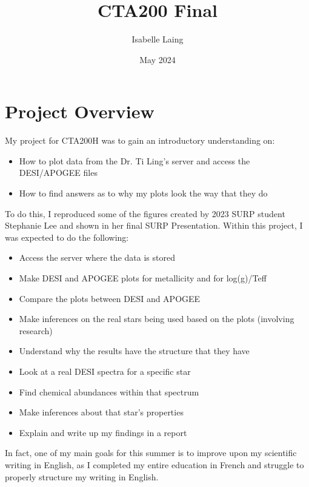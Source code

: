 \documentclass{article}
\title{CTA200 Final}
\author{Isabelle Laing}
\date{May 2024}
\begin{document}
\maketitle

\section*{Project Overview}
My project for CTA200H was to gain an introductory understanding on:
\begin{itemize}
    \item How to plot data from the Dr. Ti Ling’s server and access the DESI/APOGEE files
    \item How to find answers as to why my plots look the way that they do
\end{itemize}

To do this, I reproduced some of the figures created by 2023 SURP student Stephanie Lee and shown in her final SURP Presentation. Within this project, I was expected to do the following:
\begin{itemize}
    \item Access the server where the data is stored
    \item Make DESI and APOGEE plots for metallicity and for log(g)/Teff
    \item Compare the plots between DESI and APOGEE
    \item Make inferences on the real stars being used based on the plots (involving research)
    \item Understand why the results have the structure that they have
    \item Look at a real DESI spectra for a specific star
    \item Find chemical abundances within that spectrum
    \item Make inferences about that star’s properties
    \item Explain and write up my findings in a report
\end{itemize}

In fact, one of my main goals for this summer is to improve upon my scientific writing in English, as I completed my entire education in French and struggle to properly structure my writing in English.
\end{document}
